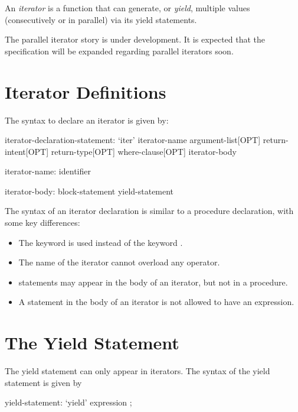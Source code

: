 \label{Iterators}

An \emph{iterator} is a function that can generate, or \emph{yield}, multiple values (consecutively or in parallel) via its yield statements.

\begin{openissue}
The parallel iterator story is under development.  It is expected that
the specification will be expanded regarding parallel iterators soon.
\end{openissue}

\section{Iterator Definitions}
\label{Iterator_Function_Definitions}

The syntax to declare an iterator is given
by:
\begin{syntax}
iterator-declaration-statement:
  `iter' iterator-name argument-list[OPT] return-intent[OPT] return-type[OPT] where-clause[OPT]
  iterator-body

iterator-name:
  identifier

iterator-body:
  block-statement
  yield-statement
\end{syntax}

The syntax of an iterator declaration is similar to a procedure declaration, with
some key differences:
\begin{itemize}
\item The keyword  is used instead of the keyword .
\item The name of the iterator cannot overload any operator.
\item {} statements may appear in the body of an iterator, but not in
a procedure.
\item A  statement in the body of an iterator is not allowed to have an expression.
\end{itemize}

\section{The Yield Statement}
\label{The_Yield_Statement}

The yield statement can only appear in iterators.  The syntax of the
yield statement is given by
\begin{syntax}
yield-statement:
  `yield' expression ;
\end{syntax}

